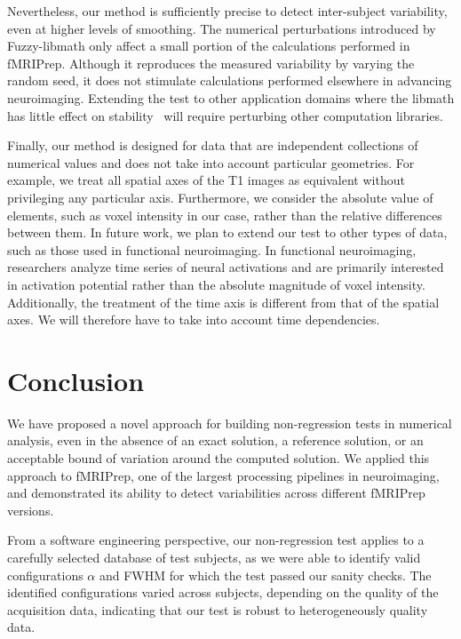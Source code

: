 \documentclass{article}
\newcommand{\fmriprep}{fMRIPrep\xspace}
\begin{document}
Nevertheless, our method is sufficiently precise to detect inter-subject variability, even at higher levels of smoothing. The numerical perturbations introduced by Fuzzy-libmath only affect a small portion of the calculations performed in \fmriprep. Although it reproduces the measured variability by varying the random seed, it does not stimulate calculations performed elsewhere in advancing neuroimaging. Extending the test to other application domains where the libmath has little effect on stability~\cite{pepe2022numerical} will require perturbing other computation libraries.

Finally, our method is designed for data that are independent collections of numerical values and does not take into account particular geometries. For example, we treat all spatial axes of the T1 images as equivalent without privileging any particular axis. Furthermore, we consider the absolute value of elements, such as voxel intensity in our case, rather than the relative differences between them. In future work, we plan to extend our test to other types of data, such as those used in functional neuroimaging. In functional neuroimaging, researchers analyze time series of neural activations and are primarily interested in activation potential rather than the absolute magnitude of voxel intensity. Additionally, the treatment of the time axis is different from that of the spatial axes. We will therefore have to take into account time dependencies.

\section{Conclusion}

We have proposed a novel approach for building non-regression tests in numerical analysis, even in the absence of an exact solution, a reference solution, or an acceptable bound of variation around the computed solution. We applied this approach to \fmriprep, one of the largest processing pipelines in neuroimaging, and demonstrated its ability to detect variabilities across different \fmriprep versions.

From a software engineering perspective, our non-regression test applies to a carefully selected database of test subjects, as we were able to identify valid configurations $\alpha$ and FWHM for which the test passed our sanity checks. The identified configurations varied across subjects, depending on the quality of the acquisition data, indicating that our test is robust to heterogeneously quality data.
\end{document}
